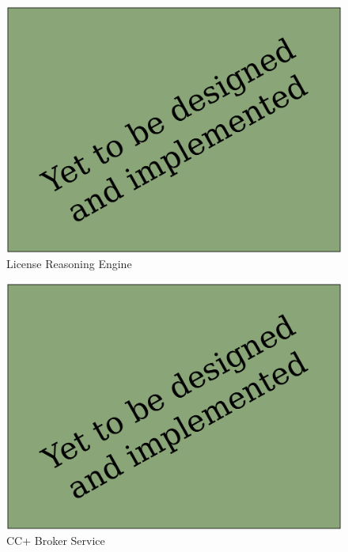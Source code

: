 \documentclass[botnum,fleqn,final]{unmeethesis}
\begin{document}
\begin{figure}[!htpb]
    \begin{center}
            \includegraphics[width=1.0\textwidth]{todo.pdf}
    \end{center}
    \caption[License Reasoning Engine]{License Reasoning Engine}
    \label{fi:licenseReasoningEngine}
\end{figure}

\begin{figure}[!htpb]
    \begin{center}
            \includegraphics[width=1.0\textwidth]{todo.pdf}
    \end{center}
    \caption[CC+ Broker Service]{CC+ Broker Service}
    \label{fi:ccPlusBrokerService}
\end{figure}
\end{document}
